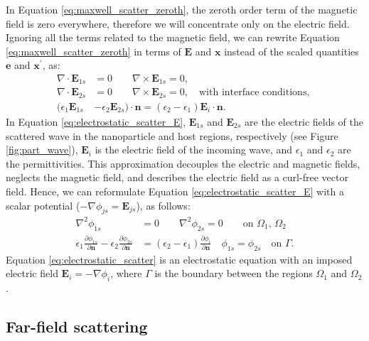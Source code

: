 In Equation \eqref{eq:maxwell_scatter_zeroth}, the zeroth order term of the magnetic field is zero
everywhere, therefore we will concentrate only on the electric field. Ignoring all the terms related 
to the magnetic field, we can rewrite Equation \eqref{eq:maxwell_scatter_zeroth} in terms of 
$\mathbf{E}$ and $\mathbf{x}$ instead of the scaled quantities $\mathbf{e}$ and
$\mathbf{x}^\prime$, as:
%
\begin{align} \label{eq:electrostatic_scatter_E}
\nabla \cdot \mathbf{E}_{1s} &= 0 \qquad \nabla \times \mathbf{E}_{1s} = 0, \nonumber \\
\nabla \cdot \mathbf{E}_{2s} &= 0 \qquad \nabla \times \mathbf{E}_{2s} = 0, \nonumber \quad
\text{with interface conditions, } \nonumber \\
(\epsilon_1\mathbf{E}_{1s} &- \epsilon_2\mathbf{E}_{2s})\cdot\mathbf{n} = (\epsilon_2-\epsilon_1)\mathbf{E}_i\cdot \mathbf{n}.
\end{align}
%
In Equation \eqref{eq:electrostatic_scatter_E}, $\mathbf{E}_{1s}$ and $\mathbf{E}_{2s}$ 
are the electric fields of the scattered wave in the nanoparticle and host regions, respectively 
(see Figure \ref{fig:part_wave}), $\mathbf{E}_{i}$ is the electric field of the incoming wave, and $\epsilon_1$ 
and $\epsilon_2$ are the permittivities. This approximation decouples the electric and magnetic fields, neglects the magnetic field, 
and describes the electric field as a curl-free vector field. Hence, we can reformulate Equation \eqref{eq:electrostatic_scatter_E} with a scalar potential
($-\nabla \phi_{js} = \mathbf{E}_{js}$), as follows:
%
\begin{align} \label{eq:electrostatic_scatter}
\nabla^2 \phi_{1s} &= 0 \qquad \nabla^2 \phi_{2s} = 0 \qquad\text{on $\Omega_1$, $\Omega_2$} \nonumber \\
\epsilon_1\frac{\partial\phi_{1s}}{\partial \mathbf{n}} - \epsilon_2\frac{\partial\phi_{2s}}{\partial\mathbf{n}} &= (\epsilon_2-\epsilon_1)\frac{\partial\phi_i}{\partial\mathbf{n}} \quad \phi_{1s} = \phi_{2s} \quad \text{on $\Gamma$}.
\end{align}
%
Equation \eqref{eq:electrostatic_scatter} is an electrostatic equation with an imposed electric
field $\mathbf{E}_i=-\nabla\phi_i$, where $\Gamma$ is the boundary between the regions $\Omega_1$ and $\Omega_2$.

\subsection{Far-field scattering} \label{sec:ff_scattering}

